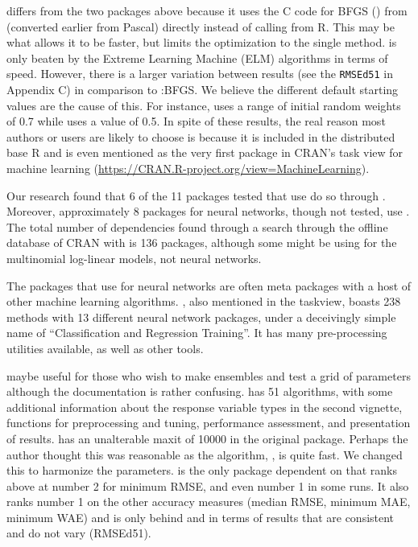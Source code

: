  \citep{R-nnet} differs from the two packages above
because it uses the \textsf{C} code for BFGS () from
 (converted earlier from Pascal) directly instead of calling
 from \textsf{R}. This may be what allows it to be faster,
but limits the optimization to the single method.  is only
beaten by the Extreme Learning Machine (ELM) algorithms in terms of
speed. However, there is a larger variation between results (see the
\texttt{RMSEd51} in Appendix C) in comparison to
:BFGS. We believe the different default starting
values are the cause of this. For instance,  uses a range
of initial random weights of 0.7 while  uses a value
of 0.5. In spite of these results, the real reason most authors or users
are likely to choose  is because it is included in the
distributed base \textsf{R} and is even mentioned as the very first
package in CRAN's task view for machine learning
(\url{https://CRAN.R-project.org/view=MachineLearning}).

Our research found that 6 of the 11 packages tested that use
 do so through . Moreover, approximately 8
packages for neural networks, though not tested, use . The
total number of  dependencies found through a search
through the offline database of CRAN with  is 136
packages, although some might be using  for the
multinomial log-linear models, not neural networks.

The packages that use  for neural networks are often meta
packages with a host of other machine learning algorithms.
 \citep{R-caret}, also mentioned in the taskview, boasts
238 methods with 13 different neural network packages, under a
deceivingly simple name of ``Classification and Regression Training''.
It has many pre-processing utilities available, as well as other tools.

 \citep{R-EnsembleBase} maybe useful for those who
wish to make ensembles and test a grid of parameters although the
documentation is rather confusing. 
\citep{R-MachineShop} has 51 algorithms, with some additional
information about the response variable types in the second vignette,
functions for preprocessing and tuning, performance assessment, and
presentation of results.  \citep{R-radiant.model}
has an unalterable maxit of 10000 in the original package. Perhaps the
author thought this was reasonable as the algorithm, , is
quite fast. We changed this to harmonize the parameters.
 \citep{R-rminer} is the only package dependent on
 that ranks above  at number 2 for minimum
RMSE, and even number 1 in some runs. It also ranks number 1 on the
other accuracy measures (median RMSE, minimum MAE, minimum WAE) and is
only behind  and  in terms of
results that are consistent and do not vary (RMSEd51).

